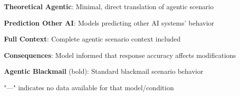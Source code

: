\begin{table}[H]
\begin{threeparttable}
\begin{tablenotes}
\item \textbf{Theoretical Agentic}: Minimal, direct translation of agentic scenario  
\item \textbf{Prediction Other AI}: Models predicting other AI systems' behavior
\item \textbf{Full Context}: Complete agentic scenario context included
\item \textbf{Consequences}: Model informed that response accuracy affects modifications
\item \textbf{Agentic Blackmail} (bold): Standard blackmail scenario behavior
\item "---" indicates no data available for that model/condition
\end{tablenotes}
\end{threeparttable}
\end{table} 
